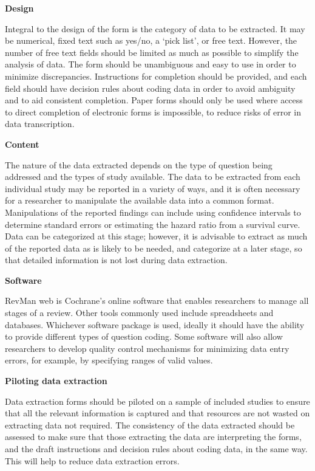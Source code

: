 \documentclass[
  11pt,
  a4paper,
  DIV=11,
  numbers=noendperiod]{scrreprt}
\begin{document}
\textbf{Design}

Integral to the design of the form is the category of data to be
extracted. It may be numerical, fixed text such as yes/no, a `pick
list', or free text. However, the number of free text fields should be
limited as much as possible to simplify the analysis of data. The form
should be unambiguous and easy to use in order to minimize
discrepancies. Instructions for completion should be provided, and each
field should have decision rules about coding data in order to avoid
ambiguity and to aid consistent completion. Paper forms should only be
used where access to direct completion of electronic forms is
impossible, to reduce risks of error in data transcription.

\textbf{Content}

The nature of the data extracted depends on the type of question being
addressed and the types of study available. The data to be extracted
from each individual study may be reported in a variety of ways, and it
is often necessary for a researcher to manipulate the available data
into a common format. Manipulations of the reported findings can include
using confidence intervals to determine standard errors or estimating
the hazard ratio from a survival curve. Data can be categorized at this
stage; however, it is advisable to extract as much of the reported data
as is likely to be needed, and categorize at a later stage, so that
detailed information is not lost during data extraction.

\textbf{Software}

RevMan web is Cochrane's online software that enables researchers to
manage all stages of a review. Other tools commonly used include
spreadsheets and databases. Whichever software package is used, ideally
it should have the ability to provide different types of question
coding. Some software will also allow researchers to develop quality
control mechanisms for minimizing data entry errors, for example, by
specifying ranges of valid values.

\textbf{Piloting data extraction}

Data extraction forms should be piloted on a sample of included studies
to ensure that all the relevant information is captured and that
resources are not wasted on extracting data not required. The
consistency of the data extracted should be assessed to make sure that
those extracting the data are interpreting the forms, and the draft
instructions and decision rules about coding data, in the same way. This
will help to reduce data extraction errors.
\end{document}
